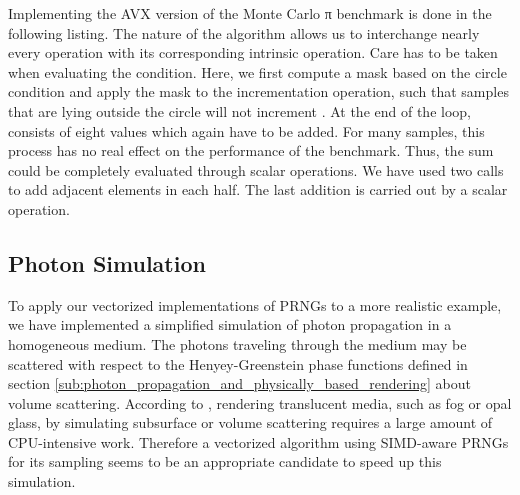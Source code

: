 \documentclass{stdlocal}
\begin{document}
    Implementing the AVX version of the Monte Carlo π benchmark is done in the following listing.
    The nature of the algorithm allows us to interchange nearly every operation with its corresponding intrinsic operation.
    Care has to be taken when evaluating the condition.
    Here, we first compute a mask based on the circle condition and apply the mask to the incrementation operation, such that samples that are lying outside the circle will not increment .
    At the end of the  loop,  consists of eight values which again have to be added.
    For many samples, this process has no real effect on the performance of the benchmark.
    Thus, the sum could be completely evaluated through scalar operations.
    We have used two  calls to add adjacent elements in each half.
    The last addition is carried out by a scalar operation.


  \subsection{Photon Simulation} %
  \label{sub:photon_benchmark}

    To apply our vectorized implementations of PRNGs to a more realistic example, we have implemented a simplified simulation of photon propagation in a homogeneous medium.
    The photons traveling through the medium may be scattered with respect to the Henyey-Greenstein phase functions defined in section \ref{sub:photon_propagation_and_physically_based_rendering} about volume scattering.
    According to \textcite{pharr2016}, rendering translucent media, such as fog or opal glass, by simulating subsurface or volume scattering requires a large amount of CPU-intensive work.
    Therefore a vectorized algorithm using SIMD-aware PRNGs for its sampling seems to be an appropriate candidate to speed up this simulation.
\end{document}
